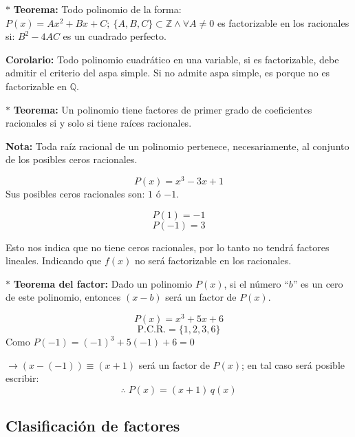 \documentclass[11pt,a4paper]{article}
\begin{document}
$\ast$ \textbf{Teorema:} Todo polinomio de la forma:
$P(x) = Ax^2 + Bx + C;\ \{A, B, C\} \subset \mathbb{Z} \wedge \forall A \neq 0$
es factorizable en los racionales si: $B^2 - 4AC$ es un cuadrado perfecto.

\textbf{Corolario:} Todo polinomio cuadrático en una variable, si es factorizable, debe
admitir el criterio del aspa simple. Si no admite aspa simple, es porque no es
factorizable en $\mathbb{Q}$.

$\ast$ \textbf{Teorema:} Un polinomio tiene factores de primer grado de coeficientes
racionales si y solo si tiene raíces racionales.

\textbf{Nota:} Toda raíz racional de un polinomio pertenece, necesariamente, al conjunto
de los posibles ceros racionales.

\begin{minipage}[t]{0.339\textwidth}
\[P(x) = x^3 - 3x + 1\]
Sus posibles ceros racionales son: $1$ ó $-1$.
\end{minipage}\hfill
\begin{minipage}[t]{0.194\textwidth}
\[P(1) = -1\]
\[P(-1) = 3\]
\end{minipage}\hfill
\begin{minipage}[t]{0.436\textwidth}
Esto nos indica que no tiene ceros racionales, por lo tanto no tendrá factores lineales.
Indicando que $f(x)$ no será factorizable en los racionales.
\end{minipage}

\bigskip
$\ast$ \textbf{Teorema del factor:} Dado un polinomio $P(x)$, si el número ``$b$'' es un
cero de este polinomio, entonces $(x-b)$ será un factor de $P(x)$.

\begin{minipage}[t]{0.436\textwidth}
\[P(x) = x^3 + 5x + 6\]
\[\text{P.C.R.} = \{1, 2, 3, 6\}\]
Como $P(-1) = (-1)^3 + 5(-1) + 6 = 0$
\end{minipage}\hfill
\begin{minipage}[t]{0.533\textwidth}
$\rightarrow (x - (-1)) \equiv (x+1)$ será un factor de $P(x)$; en tal caso será posible
escribir:
\[\boxed{\therefore\; P(x) = (x+1)\,q(x)}\]
\end{minipage}

\subsection*{Clasificación de factores}
\end{document}
